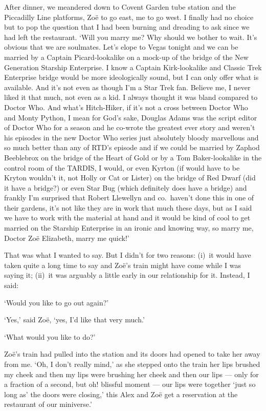 After dinner, we meandered down to Covent Garden tube station and
the Piccadilly Line platforms, Zo{\"e} to go east, me to go west. I
finally had no choice but to pop the question that I had been
burning and dreading to ask since we had left the restaurant. `Will
you marry me? Why should we bother to wait. It's obvious that we are
soulmates. Let's elope to Vegas tonight and we can be married by a
Captain Picard-lookalike on a mock-up of the bridge of the
{\twelvesl New Generation\/} Starship {\twelvesl Enterprise}. I know
a Captain Kirk-lookalike and Classic {\twelvesl Trek\/} {\twelvesl
Enterprise\/} bridge would be more ideologically sound, but I can
only offer what is available. And it's not even as though I'm a
{\twelvesl Star Trek\/} fan. Believe me, I never liked it that much,
not even as a kid. I always thought it was bland compared to
{\twelvesl Doctor Who}. And what's {\twelvesl Hitch-Hiker\/}, if
it's not a cross between {\twelvesl Doctor Who\/} and {\twelvesl
Monty Python\/}, I mean for God's sake, Douglas Adams was the script
editor of {\twelvesl Doctor Who\/} for a season and he co-wrote the
greatest ever story and weren't his episodes in the new {\twelvesl
Doctor Who\/} series just absolutely bloody marvellous and so much
better than any of RTD's episode and if we could be married by
Zaphod Beeblebrox on the bridge of the {\twelvesl Heart of Gold\/}
or by a Tom Baker-lookalike in the control room of the TARDIS, I
would, or even Kyrton (if would have to be Kryton wouldn't it, not
Holly or Cat or Lister) on the bridge of {\twelvesl Red Dwarf} (did
it have a bridge?) or even {\twelvesl Star Bug} (which definitely
does have a bridge) and frankly I'm surprised that Robert Llewellyn
and co.~haven't done this in one of their gardens, it's not like
they are in work that much these days, but as I said we have to work
with the material at hand and it would be kind of cool to get
married on the Starship {\twelvesl Enterprise\/} in an ironic and
knowing way, so marry me, Doctor Zo{\"e} Elizabeth, marry me quick!'

That was what I wanted to say. But I didn't for two reasons: (i)~it
would have taken quite a long time to say and Zo{\"e}'s train might
have come while I was saying it; (ii)~it was arguably a {\twelveit
little\/} early in our relationship for it. Instead, I said:

`Would you like to go out again?'

`Yes,' said Zo{\"e}, `yes, I'd like that very much.'

`What would you like to do?'

Zo{\"e}'s train had pulled into the station and its doors had opened
to take her away from me. `Oh, I don't really mind,' as she stepped
onto the train her lips brushed my cheek and then my lips were
brushing her cheek and then our lips --- only for a fraction of a
second, but oh! blissful moment --- our lips were together `just so
long as' the doors were closing,' this Alex and Zo{\"e} get a
reservation at the restaurant of our miniverse.'
\vfill\eject
